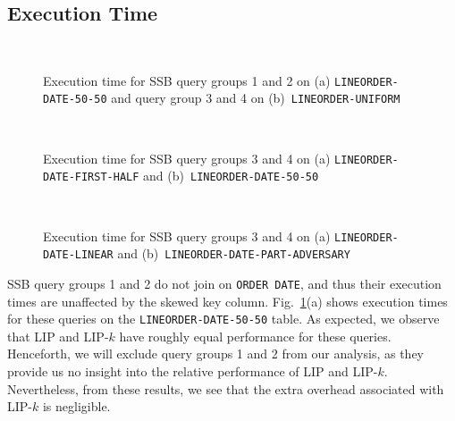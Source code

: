 \subsection{Execution Time}
\label{sec:time}

\begin{figure}
    \centering
    \\
    \caption{Execution time for SSB query groups 1 and 2 on (a) \texttt{LINEORDER-DATE-50-50} and query group 3 and 4 on (b)~\texttt{LINEORDER-UNIFORM}}
    \label{fig:times0}
\end{figure}

\begin{figure}
    \centering
    \\
    \caption{Execution time for SSB query groups 3 and 4 on (a) \texttt{LINEORDER-DATE-FIRST-HALF} and (b)~\texttt{LINEORDER-DATE-50-50}}
    \label{fig:times1}
\end{figure}


\begin{figure}
    \centering    
    \\
    \caption{Execution time for SSB query groups 3 and 4 on (a) \texttt{LINEORDER-DATE-LINEAR} and (b)~\texttt{LINEORDER-DATE-PART-ADVERSARY}}
    \label{fig:times2}
\end{figure}

SSB query groups 1 and 2 do not join on \texttt{ORDER DATE}, 
and thus their execution times are unaffected by the skewed key column. 
Fig.~\ref{fig:times0}(a) shows execution times for these queries on the \texttt{LINEORDER-DATE-50-50} table.
As expected, we observe that LIP and LIP-$k$ have roughly equal performance for these queries.
Henceforth, we will exclude query groups 1 and 2 from our analysis, 
as they provide us no insight into the relative performance of LIP and LIP-$k$. 
Nevertheless, from these results, we see that the extra overhead associated with LIP-$k$ is negligible.

